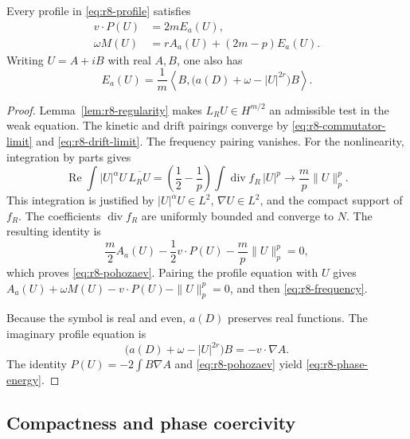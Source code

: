 \begin{lemma}\label{lem:r8-identities}
Every profile in \eqref{eq:r8-profile} satisfies
\begin{align}
 v\cdot P(U)&=2mE_a(U),\label{eq:r8-pohozaev}\\
 \omega M(U)&=rA_a(U)+(2m-p)E_a(U).\label{eq:r8-frequency}
\end{align}
Writing $U=A+iB$ with real $A,B$, one also has
\begin{equation}\label{eq:r8-phase-energy}
 E_a(U)=\frac1m
 \left\langle B,\bigl(a(D)+\omega-|U|^{2r}\bigr)B\right\rangle.
\end{equation}
\end{lemma}
\begin{proof}
Lemma~\ref{lem:r8-regularity} makes $L_RU\in H^{m/2}$ an admissible
test in the weak equation. The kinetic and drift pairings converge
by \eqref{eq:r8-commutator-limit} and \eqref{eq:r8-drift-limit}.
The frequency pairing vanishes. For the nonlinearity, integration
by parts gives
\[
 \operatorname{Re}\int |U|^\alpha U\,\overline{L_RU}
 =
 \left(\frac12-\frac1p\right)
 \int\operatorname{div}f_R\,|U|^p
 \longrightarrow\frac mp\|U\|_p^p.
\]
This integration is justified by $|U|^\alpha U\in L^2$,
$\nabla U\in L^2$, and the compact support of $f_R$.
The coefficients $\operatorname{div}f_R$ are uniformly bounded
and converge to $N$. The resulting identity is
\[
 \frac m2 A_a(U)-\frac12v\cdot P(U)-\frac mp\|U\|_p^p=0,
\]
which proves \eqref{eq:r8-pohozaev}. Pairing the profile equation
with $U$ gives
$A_a(U)+\omega M(U)-v\cdot P(U)-\|U\|_p^p=0$,
and then \eqref{eq:r8-frequency}.

Because the symbol is real and even, $a(D)$ preserves real
functions. The imaginary profile equation is
\[
 \bigl(a(D)+\omega-|U|^{2r}\bigr)B=-v\cdot\nabla A.
\]
The identity $P(U)=-2\int B\nabla A$ and
\eqref{eq:r8-pohozaev} yield \eqref{eq:r8-phase-energy}.
\end{proof}

\subsection{Compactness and phase coercivity}

